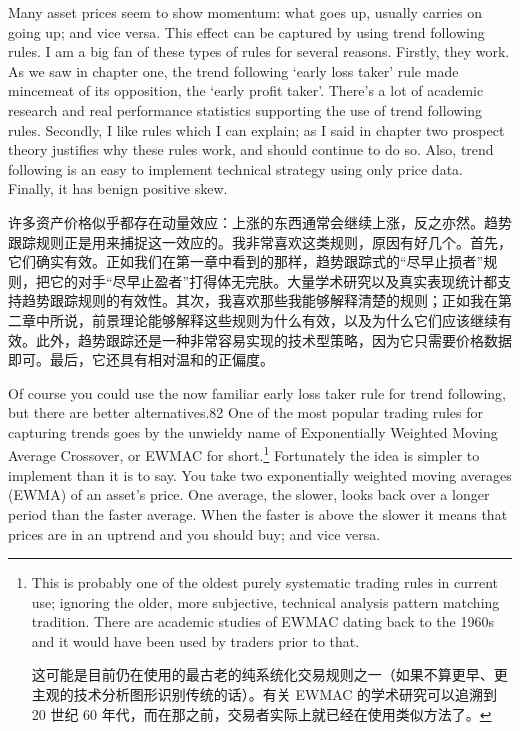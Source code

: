 \begin{englishblock} Many asset prices seem to show momentum: what goes up, usually carries on going up; and vice versa. This effect can be captured by using trend following rules. I am a big fan of these types of rules for several reasons. Firstly, they work. As we saw in chapter one, the trend following ‘early loss taker' rule made mincemeat of its opposition, the ‘early profit taker'. There's a lot of academic research and real performance statistics supporting the use of trend following rules. Secondly, I like rules which I can explain; as I said in chapter two prospect theory justifies why these rules work, and should continue to do so. Also, trend following is an easy to implement technical strategy using only price data. Finally, it has benign positive skew. \end{englishblock}

\begin{chineseblock}许多资产价格似乎都存在动量效应：上涨的东西通常会继续上涨，反之亦然。趋势跟踪规则正是用来捕捉这一效应的。我非常喜欢这类规则，原因有好几个。首先，它们确实有效。正如我们在第一章中看到的那样，趋势跟踪式的“尽早止损者”规则，把它的对手“尽早止盈者”打得体无完肤。大量学术研究以及真实表现统计都支持趋势跟踪规则的有效性。其次，我喜欢那些我能够解释清楚的规则；正如我在第二章中所说，前景理论能够解释这些规则为什么有效，以及为什么它们应该继续有效。此外，趋势跟踪还是一种非常容易实现的技术型策略，因为它只需要价格数据即可。最后，它还具有相对温和的正偏度。\end{chineseblock}

\bipairgap

\begin{englishblock} Of course you could use the now familiar early loss taker rule for trend following, but there are better alternatives.82 One of the most popular trading rules for capturing trends goes by the unwieldy name of Exponentially Weighted Moving Average Crossover, or EWMAC for short.\footnote{This is probably one of the oldest purely systematic trading rules in current use; ignoring the older, more subjective, technical analysis pattern matching tradition. There are academic studies of EWMAC dating back to the 1960s and it would have been used by traders prior to that. \par 这可能是目前仍在使用的最古老的纯系统化交易规则之一（如果不算更早、更主观的技术分析图形识别传统的话）。有关 EWMAC 的学术研究可以追溯到 20 世纪 60 年代，而在那之前，交易者实际上就已经在使用类似方法了。} Fortunately the idea is simpler to implement than it is to say. You take two exponentially weighted moving averages (EWMA) of an asset's price. One average, the slower, looks back over a longer period than the faster average. When the faster is above the slower it means that prices are in an uptrend and you should buy; and vice versa. \end{englishblock}

